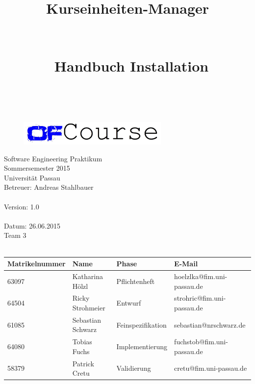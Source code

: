 \documentclass[a4paper, 12pt]{scrreprt}
\begin{document}
	\thispagestyle{plain}
	
	\begin{titlepage}
		\begin{center}
			\begin{figure}[ht]
				\centering
				\includegraphics[width=0.66\textwidth, angle=0]{logo/name_blau_ofCourse.jpg}
			\end{figure}
			
			\begin{title}
				\title{\Huge{\textbf{Kurseinheiten-Manager \\ \ \\ \ \\ \
							Handbuch Installation\\ 
							\ \\}}}
				
			\end{title}
			\hspace{3cm}
			
			Software Engineering Praktikum \\
			Sommersemester 2015\\
			Universität Passau\\
			
			
			Betreuer: Andreas Stahlbauer \\
        	\hspace{1,5cm}\\
        	Version: 1.0 \\
        	\hspace{1,5cm}\\
        	Datum: 26.06.2015\\[50pt]
        	Team 3 \\
    
		    \ \\
        
        \begin{tabular}{ | l | l | l | l |}
        	\hline
        	\textbf{Matrikelnummer} & \textbf{Name} & \textbf{Phase} & \textbf{E-Mail}  \\ \hline
        	63097 & Katharina Hölzl & Pflichtenheft & hoelzlka@fim.uni-passau.de \\ \hline
        	64504 & Ricky Strohmeier& Entwurf & strohric@fim.uni-passau.de  \\ \hline
        	61085 & Sebastian Schwarz & Feinspezifikation & sebastian@nrschwarz.de \\ \hline 
        	64080 & Tobias Fuchs & Implementierung  &  fuchstob@fim.uni-passau.de\\ \hline
        	58379 & Patrick Cretu  &  Validierung & cretu@fim.uni-passau.de \\ \hline
        \end{tabular}
        

\end{center}
\end{titlepage}
\end{document}
